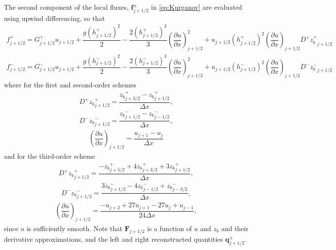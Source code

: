 \documentclass[preprint,sort&compress,1p]{article}
\begin{document}
The second component of the local fluxes, $\mathbf{f}^\pm_{j+1/2}$ in \eqref{eq:Kurganov} are evaluated using upwind differencing, so that
\begin{gather}
f^+_{j+1/2} = G^+_{j+1/2} u_{j+1/2} + \dfrac{g(h^+_{j+1/2})^2}{2} - \dfrac{2(h^+_{j+1/2})^3}{3} \left( \dfrac{\partial u}{\partial x}\right)_{j+1/2}^2 +u_{j+1/2}  (h^+_{j+1/2})^2 \left( \dfrac{\partial u}{\partial x}\right)_{j+1/2} D^{+} {z_b^+}_{j+1/2}
\end{gather}
\begin{gather}
f^-_{j+1/2} = G^-_{j+1/2} u_{j+1/2} + \dfrac{g(h^-_{j+1/2})^2}{2} - \dfrac{2(h^-_{j+1/2})^3}{3} \left( \dfrac{\partial u}{\partial x}\right)_{j+1/2}^2 + u_{j+1/2}  (h^-_{j+1/2} )^2 \left( \dfrac{\partial u}{\partial x}\right)_{j+1/2} D^{-} {z_b^-}_{j+1/2}
\end{gather}
where for the first and second-order schemes
\begin{gather}
D^{+} {z_b}^+_{j+1/2}=\dfrac { {z_b}^+_{j+3/2} - {z_b}^+_{j+1/2} }{\Delta x},
\end{gather}
\begin{gather}
D^{-} {z_b}^-_{j+1/2} = \dfrac{{z_b}^-_{j+1/2} - {z_b}^-_{j-1/2} }{\Delta x},
\end{gather}
\begin{gather}
 \left( \dfrac{\partial u}{\partial x}\right)_{j+1/2} =\dfrac{ {u_{j+1} - u_{j}} }{\Delta x}
\end{gather}
and for the third-order scheme
\begin{gather}
D^{+} {z_b}^+_{j+1/2} = \dfrac{-{z_b}^+_{j+5/2} + 4 {z_b}^+_{j+3/2} + 3 {z_b}^+_{j+1/2} }{\Delta x},
\end{gather}
\begin{gather}
D^{-} {z_b}^-_{j+1/2} = \dfrac{3 {z_b}^-_{j+1/2} - 4 {z_b}^-_{j-1/2} + {z_b}^-_{j-3/2} }{\Delta x},
\end{gather}
\begin{gather}
 \left( \dfrac{\partial u}{\partial x}\right)_{j+1/2} =  \dfrac{{-u_{j + 2} + 27u_{j+1} - 27u_{j} + u_{j-1}} }{24 \Delta x},
\end{gather}
since $u$ is sufficiently smooth.
Note that $\mathbf{F}_{j+1/2}$ is a function of $u$ and $z_b$ and their derivative approximations, and
the left and right reconstructed quantities $\mathbf{q}^{\pm}_{j+1/2}$.
\end{document}

